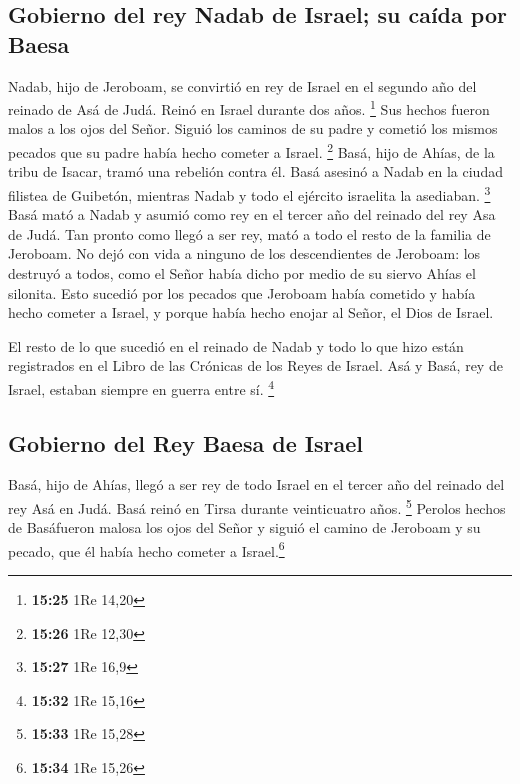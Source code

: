 \hypertarget{gobierno-del-rey-nadab-de-israel-su-cauxedda-por-baesa}{%
\subsection{Gobierno del rey Nadab de Israel; su caída por
Baesa}\label{gobierno-del-rey-nadab-de-israel-su-cauxedda-por-baesa}}

 Nadab, hijo de Jeroboam, se convirtió en rey de Israel
en el segundo año del reinado de Asá de Judá. Reinó en Israel durante
dos años. \footnote{\textbf{15:25} 1Re 14,20}  Sus hechos
fueron malos a los ojos del Señor. Siguió los caminos de su padre y
cometió los mismos pecados que su padre había hecho cometer a Israel.
\footnote{\textbf{15:26} 1Re 12,30}  Basá, hijo de Ahías,
de la tribu de Isacar, tramó una rebelión contra él. Basá asesinó a
Nadab en la ciudad filistea de Guibetón, mientras Nadab y todo el
ejército israelita la asediaban. \footnote{\textbf{15:27} 1Re 16,9}
 Basá mató a Nadab y asumió como rey en el tercer año del
reinado del rey Asa de Judá.  Tan pronto como llegó a ser
rey, mató a todo el resto de la familia de Jeroboam. No dejó con vida a
ninguno de los descendientes de Jeroboam: los destruyó a todos, como el
Señor había dicho por medio de su siervo Ahías el silonita.
 Esto sucedió por los pecados que Jeroboam había cometido
y había hecho cometer a Israel, y porque había hecho enojar al Señor, el
Dios de Israel.

 El resto de lo que sucedió en el reinado de Nadab y todo
lo que hizo están registrados en el Libro de las Crónicas de los Reyes
de Israel.  Asá y Basá, rey de Israel, estaban siempre en
guerra entre sí. \footnote{\textbf{15:32} 1Re 15,16}

\hypertarget{gobierno-del-rey-baesa-de-israel}{%
\subsection{Gobierno del Rey Baesa de
Israel}\label{gobierno-del-rey-baesa-de-israel}}

 Basá, hijo de Ahías, llegó a ser rey de todo Israel en
el tercer año del reinado del rey Asá en Judá. Basá reinó en Tirsa
durante veinticuatro años. \footnote{\textbf{15:33} 1Re 15,28}
 Perolos hechos de Basáfueron malosa los ojos del Señor y
siguió el camino de Jeroboam y su pecado, que él había hecho cometer a
Israel.\footnote{\textbf{15:34} 1Re 15,26}

